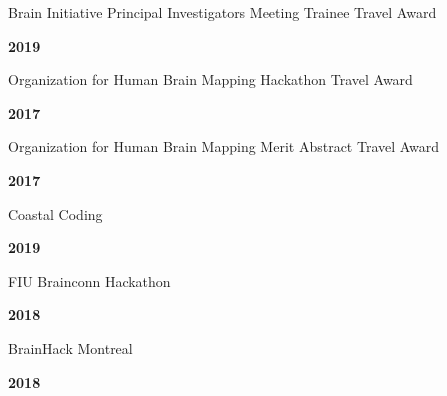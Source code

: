 \documentclass[10pt]{article}
\newcommand{\sectionstyle}{\LARGE \fontfamily{lmr}\selectfont}
\begin{document}
\bigskip

\begin{center}\sectionstyle{HONORS AND AWARDS}\end{center}

\begin{minipage}[t]{.85\linewidth}
\flushleft
\noindent
Brain Initiative Principal Investigators Meeting Trainee Travel Award
\end{minipage}
\hfill
\begin{minipage}[t]{.15\linewidth}
\flushright
\noindent
\textsc{\textbf{2019}}
\end{minipage}

\begin{minipage}[t]{.85\linewidth}
\flushleft
\noindent
Organization for Human Brain Mapping Hackathon Travel Award
\end{minipage}
\hfill
\begin{minipage}[t]{.15\linewidth}
\flushright
\noindent
\textsc{\textbf{2017}}
\end{minipage}

\begin{minipage}[t]{.85\linewidth}
\flushleft
\noindent
Organization for Human Brain Mapping Merit Abstract Travel Award
\end{minipage}
\hfill
\begin{minipage}[t]{.15\linewidth}
\flushright
\noindent
\textsc{\textbf{2017}}
\end{minipage}

\bigskip

\begin{center}\sectionstyle{HACKATHONS}\end{center}

\begin{minipage}[t]{.85\linewidth}
\flushleft
\noindent
Coastal Coding
\end{minipage}
\hfill
\begin{minipage}[t]{.15\linewidth}
\flushright
\noindent
\textsc{\textbf{2019}}
\end{minipage}

\begin{minipage}[t]{.85\linewidth}
\flushleft
\noindent
FIU Brainconn Hackathon
\end{minipage}
\hfill
\begin{minipage}[t]{.15\linewidth}
\flushright
\noindent
\textsc{\textbf{2018}}
\end{minipage}

\begin{minipage}[t]{.85\linewidth}
\flushleft
\noindent
BrainHack Montreal
\end{minipage}
\hfill
\begin{minipage}[t]{.15\linewidth}
\flushright
\noindent
\textsc{\textbf{2018}}
\end{minipage}
\end{document}
